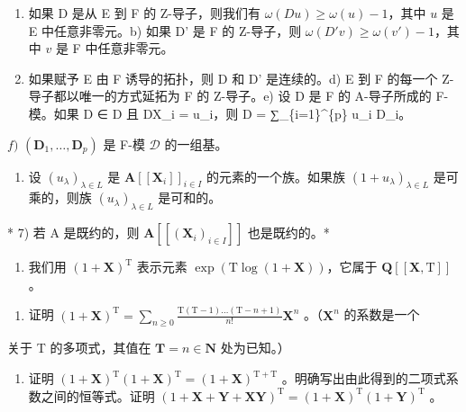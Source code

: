 \begin{enumerate}
\def\labelenumi{\alph{enumi})}
\item
  如果 D 是从 E 到 F 的 Z-导子，则我们有 \(\omega(Du) \geqslant \omega(u) - 1\)，其中 \(u\) 是 E 中任意非零元。b) 如果 D' 是 F 的 Z-导子，则 \(\omega(D'v) \geqslant \omega(v') - 1\)，其中 \(v\) 是 F 中任意非零元。
\item
  如果赋予 E 由 F 诱导的拓扑，则 D 和 D' 是连续的。d) E 到 F 的每一个 Z-导子都以唯一的方式延拓为 F 的 Z-导子。e) 设 D 是 F 的 A-导子所成的 F-模。如果 D ∈ D 且 DX\_i = u\_i，则 D = ∑\_\{i=1\}\^{}\{p\} u\_i D\_i。
\end{enumerate}

\(f)\) \((\mathbf{D}_1,\dots ,\mathbf{D}_p)\) 是 F-模 \(\mathcal{D}\) 的一组基。

\begin{enumerate}
\def\labelenumi{\arabic{enumi})}
\setcounter{enumi}{5}
\tightlist
\item
  设 \((u_{\lambda})_{\lambda \in L}\) 是 \(\mathbf{A}[[\mathbf{X}_i]]_{i\in I}\) 的元素的一个族。如果族 \((1 + u_{\lambda})_{\lambda \in L}\) 是可乘的，则族 \((u_{\lambda})_{\lambda \in L}\) 是可和的。
\end{enumerate}

* 7) 若 A 是既约的，则 \(\mathbf{A}[[(\mathbf{X}_i)_{i\in I}]]\) 也是既约的。*

\begin{enumerate}
\def\labelenumi{\arabic{enumi})}
\setcounter{enumi}{7}
\tightlist
\item
  我们用 \((1 + \mathbf{X})^{\mathrm{T}}\) 表示元素 \(\exp (\mathrm{T}\log (1 + \mathbf{X}))\)，它属于 \(\mathbf{Q}[[\mathbf{X},\mathrm{T}]]\) 。
\end{enumerate}

\begin{enumerate}
\def\labelenumi{\alph{enumi})}
\tightlist
\item
  证明 \((1 + \mathbf{X})^{\mathrm{T}} = \sum_{n\geqslant 0}\frac{\mathrm{T}(\mathrm{T} - 1)\dots(\mathrm{T} - n + 1)}{n!}\mathbf{X}^{n}\) 。（\(\mathbf{X}^n\) 的系数是一个
\end{enumerate}

关于 T 的多项式，其值在 \(\mathbf{T} = n\in \mathbf{N}\) 处为已知。）

\begin{enumerate}
\def\labelenumi{\alph{enumi})}
\setcounter{enumi}{1}
\tightlist
\item
  证明 \((1 + \mathbf{X})^{\mathrm{T}}(1 + \mathbf{X})^{\mathrm{T}} = (1 + \mathbf{X})^{\mathrm{T} + \mathrm{T}}\) 。明确写出由此得到的二项式系数之间的恒等式。证明 \((1 + \mathbf{X} + \mathbf{Y} + \mathbf{XY})^{\mathrm{T}} = (1 + \mathbf{X})^{\mathrm{T}}(1 + \mathbf{Y})^{\mathrm{T}}\) 。
\end{enumerate}

